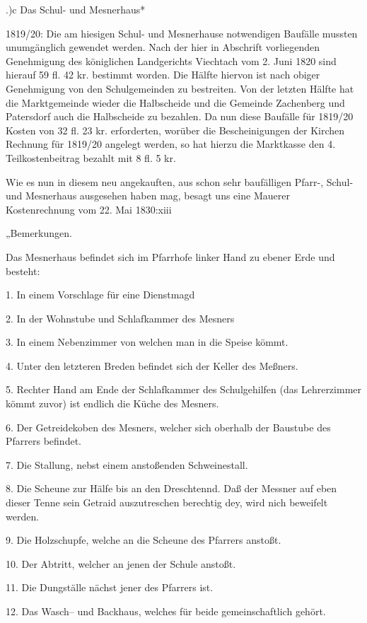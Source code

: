\documentclass[12pt,a4paper]{book}
\begin{document}
.)c Das Schul- und Mesnerhaus*

1819/20: Die am hiesigen Schul- und Mesnerhause notwendigen Baufälle mussten
unumgänglich gewendet werden. Nach der hier in Abschrift vorliegenden
Genehmigung des königlichen Landgerichts Viechtach vom 2. Juni 1820 sind hierauf
59 fl. 42 kr. bestimmt worden. Die Hälfte hiervon ist nach obiger Genehmigung
von den Schulgemeinden zu bestreiten. Von der letzten Hälfte hat die
Marktgemeinde wieder die Halbscheide und die Gemeinde Zachenberg und Patersdorf
auch die Halbscheide zu bezahlen. Da nun diese Baufälle für 1819/20 Kosten von
32 fl. 23 kr. erforderten, worüber die Bescheinigungen der Kirchen Rechnung für
1819/20 angelegt werden, so hat hierzu die Marktkasse den 4. Teilkostenbeitrag
bezahlt mit 8 fl. 5 kr.

Wie es nun in diesem neu angekauften, aus schon sehr baufälligen Pfarr-, Schul-
und Mesnerhaus ausgesehen haben mag, besagt uns eine Mauerer Kostenrechnung vom
22. Mai 1830:xiii

„Bemerkungen.

 Das Mesnerhaus befindet sich im Pfarrhofe linker Hand zu ebener Erde und
 besteht:

1. In einem Vorschlage für eine Dienstmagd

2. In der Wohnstube und Schlafkammer des Mesners

3. In einem Nebenzimmer von welchen man in die Speise kömmt.

4. Unter den letzteren Breden befindet sich der Keller des Meßners.

5. Rechter Hand am Ende der Schlafkammer des Schulgehilfen (das Lehrerzimmer
kömmt zuvor) ist endlich die Küche des Mesners.

6. Der Getreidekoben des Mesners, welcher sich oberhalb der Baustube des
Pfarrers befindet.

7. Die Stallung, nebst einem anstoßenden Schweinestall.

8. Die Scheune  zur Hälfe bis an den Dreschtennd. Daß der Messner auf eben
dieser Tenne sein Getraid auszutreschen berechtig dey, wird nich beweifelt
werden.

9. Die Holzschupfe, welche an die Scheune des Pfarrers anstoßt.

10. Der Abtritt, welcher an jenen der Schule anstoßt.

11. Die Dungställe nächst jener des Pfarrers ist.

12. Das Wasch– und Backhaus, welches für beide gemeinschaftlich gehört.
\end{document}

